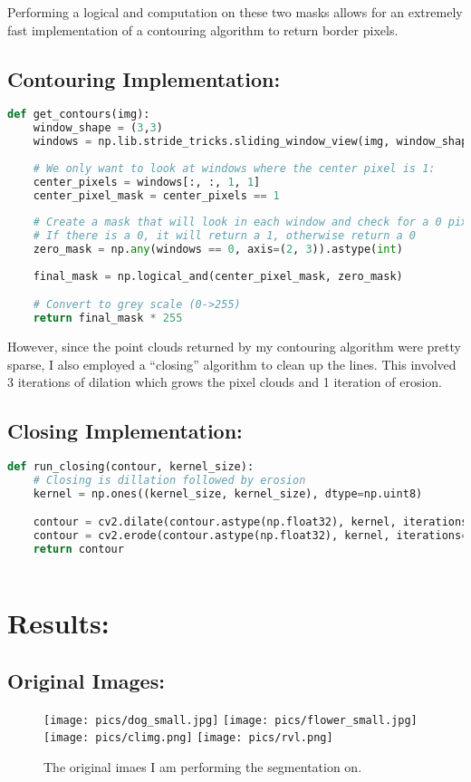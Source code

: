 \documentclass{article}
\begin{document}
Performing a logical and computation on these two masks allows for an extremely fast implementation of a contouring algorithm to return
border pixels.

\subsection{Contouring Implementation:}
\begin{lstlisting}[language=Python]
def get_contours(img):
    window_shape = (3,3)
    windows = np.lib.stride_tricks.sliding_window_view(img, window_shape)
    
    # We only want to look at windows where the center pixel is 1:
    center_pixels = windows[:, :, 1, 1]
    center_pixel_mask = center_pixels == 1
    
    # Create a mask that will look in each window and check for a 0 pixel
    # If there is a 0, it will return a 1, otherwise return a 0
    zero_mask = np.any(windows == 0, axis=(2, 3)).astype(int)
    
    final_mask = np.logical_and(center_pixel_mask, zero_mask)

    # Convert to grey scale (0->255)
    return final_mask * 255
\end{lstlisting}

However, since the point clouds returned by my contouring algorithm were pretty sparse, I also employed a ``closing'' algorithm
to clean up the lines. This involved 3 iterations of dilation which grows the pixel clouds and 1 iteration of erosion.
\subsection{Closing Implementation:}
\begin{lstlisting}[language=Python]    
def run_closing(contour, kernel_size):
    # Closing is dillation followed by erosion
    kernel = np.ones((kernel_size, kernel_size), dtype=np.uint8)

    contour = cv2.dilate(contour.astype(np.float32), kernel, iterations=3)
    contour = cv2.erode(contour.astype(np.float32), kernel, iterations=1)
    return contour
    
\end{lstlisting}


\section{Results:}
\subsection{Original Images:}
\begin{figure}[H]
    \centering
    \texttt{[image: pics/dog\_small.jpg]}
    \texttt{[image: pics/flower\_small.jpg]}
    \texttt{[image: pics/climg.png]}
    \texttt{[image: pics/rvl.png]}
    \caption[short]{The original imaes I am performing the segmentation on.}
    \label{fig:orig-images}
\end{figure}
\end{document}
